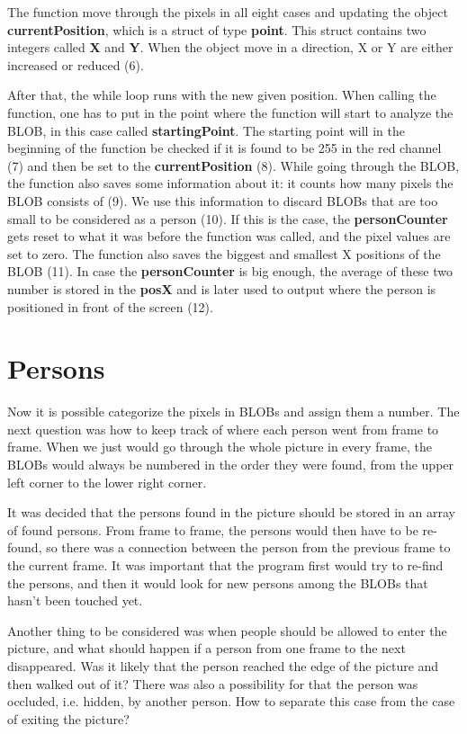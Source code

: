 The function move through the pixels in all eight cases and updating the object \textbf{currentPosition}, which is a struct of type \textbf{point}. This struct contains two integers called \textbf{X} and \textbf{Y}. When the object move in a direction, X or Y are either increased or reduced (6).

After that, the while loop runs with the new given position. When calling the function, one has to put in the point where the function will start to analyze the BLOB, in this case called \textbf{startingPoint}. The starting point will in the beginning of the function be checked if it is found to be 255 in the red channel (7) and then be set to the \textbf{currentPosition} (8). While going through the BLOB, the function also saves some information about it: it counts how many pixels the BLOB consists of (9). We use this information to discard BLOBs that are too small to be considered as a person (10). If this is the case, the \textbf{personCounter} gets reset to what it was before the function was called, and the pixel values are set to zero. The function also saves the biggest and  smallest X positions of the BLOB (11). In case the \textbf{personCounter} is big enough, the average of these two number is stored in the \textbf{posX} and is later used to output where the person is positioned in front of the screen (12).

\section{Persons}
Now it is possible categorize the pixels in BLOBs and assign them a number. The next question was how to keep track of where each person went from frame to frame. When we just would go through the whole picture in every frame, the BLOBs would always be numbered in the order they were found, from the upper left corner to the lower right corner.

It was decided that the persons found in the picture should be stored in an array of found persons. From frame to frame, the persons would then have to be re-found, so there was a connection between the person from the previous frame to the current frame. It was important that the program first would try to re-find the persons, and then it would look for new persons among the BLOBs that hasn't been touched yet.

Another thing to be considered was when people should be allowed to enter the picture, and what should happen if a person from one frame to the next disappeared. Was it likely that the person reached the edge of the picture and then walked out of it? There was also a possibility for that the person was occluded, i.e. hidden, by another person. How to separate this case from the case of exiting the picture?

